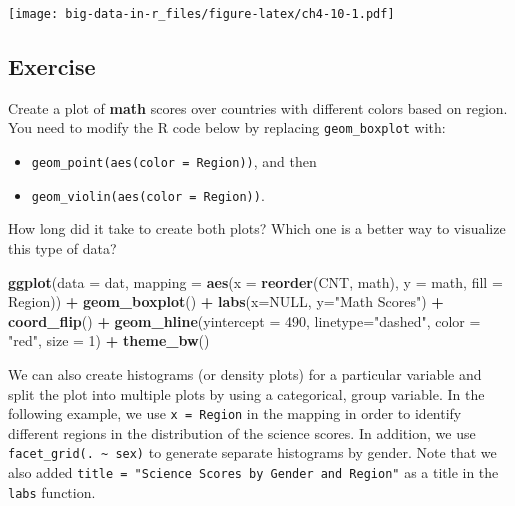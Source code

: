 \documentclass[]{book}
\newenvironment{Shaded}{\begin{snugshade}}{\end{snugshade}}
\newcommand{\DataTypeTok}[1]{\textcolor[rgb]{0.13,0.29,0.53}{#1}}
\newcommand{\DecValTok}[1]{\textcolor[rgb]{0.00,0.00,0.81}{#1}}
\newcommand{\KeywordTok}[1]{\textcolor[rgb]{0.13,0.29,0.53}{\textbf{#1}}}
\newcommand{\NormalTok}[1]{#1}
\newcommand{\OperatorTok}[1]{\textcolor[rgb]{0.81,0.36,0.00}{\textbf{#1}}}
\newcommand{\OtherTok}[1]{\textcolor[rgb]{0.56,0.35,0.01}{#1}}
\newcommand{\StringTok}[1]{\textcolor[rgb]{0.31,0.60,0.02}{#1}}
\providecommand{\tightlist}{%
  \setlength{\itemsep}{0pt}\setlength{\parskip}{0pt}}
\begin{document}
\texttt{[image: big-data-in-r\_files/figure-latex/ch4-10-1.pdf]}

\hypertarget{exercise}{%
\subsection{Exercise}\label{exercise}}

Create a plot of \textbf{math} scores over countries with different colors based on region. You need to modify the R code below by replacing \texttt{geom\_boxplot} with:

\begin{itemize}
\tightlist
\item
  \texttt{geom\_point(aes(color\ =\ Region))}, and then
\item
  \texttt{geom\_violin(aes(color\ =\ Region))}.
\end{itemize}

How long did it take to create both plots? Which one is a better way to visualize this type of data?

\begin{Shaded}
\begin{Highlighting}[]
\KeywordTok{ggplot}\NormalTok{(}\DataTypeTok{data =}\NormalTok{ dat,}
       \DataTypeTok{mapping =} \KeywordTok{aes}\NormalTok{(}\DataTypeTok{x =} \KeywordTok{reorder}\NormalTok{(CNT, math), }\DataTypeTok{y =}\NormalTok{ math, }\DataTypeTok{fill =}\NormalTok{ Region)) }\OperatorTok{+}
\StringTok{  }\KeywordTok{geom_boxplot}\NormalTok{() }\OperatorTok{+}
\StringTok{  }\KeywordTok{labs}\NormalTok{(}\DataTypeTok{x=}\OtherTok{NULL}\NormalTok{, }\DataTypeTok{y=}\StringTok{"Math Scores"}\NormalTok{) }\OperatorTok{+}
\StringTok{  }\KeywordTok{coord_flip}\NormalTok{() }\OperatorTok{+}
\StringTok{  }\KeywordTok{geom_hline}\NormalTok{(}\DataTypeTok{yintercept =} \DecValTok{490}\NormalTok{, }\DataTypeTok{linetype=}\StringTok{"dashed"}\NormalTok{, }\DataTypeTok{color =} \StringTok{"red"}\NormalTok{, }\DataTypeTok{size =} \DecValTok{1}\NormalTok{) }\OperatorTok{+}
\StringTok{  }\KeywordTok{theme_bw}\NormalTok{()}
\end{Highlighting}
\end{Shaded}

We can also create histograms (or density plots) for a particular variable and split the plot into multiple plots by using a categorical, group variable. In the following example, we use \texttt{x\ =\ Region} in the mapping in order to identify different regions in the distribution of the science scores. In addition, we use \texttt{facet\_grid(.\ \textasciitilde{}\ sex)} to generate separate histograms by gender. Note that we also added \texttt{title\ =\ "Science\ Scores\ by\ Gender\ and\ Region"} as a title in the \texttt{labs} function.
\end{document}
